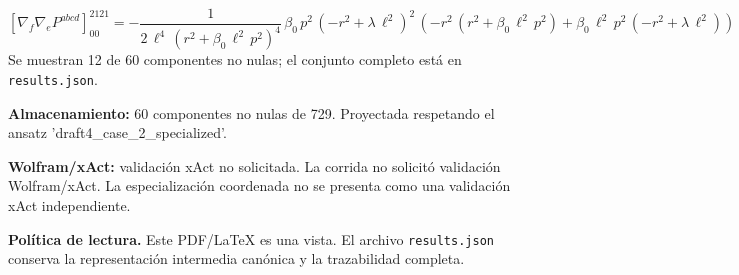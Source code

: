 \documentclass[11pt]{article}
\begin{document}
\begin{dmath*}[breakdepth={5}]
\left[\nabla_f\nabla_e P^{abcd}\right]_{00}^{2121} = -\frac{1}{2\,{\ell}^{4}\,{\left({r}^{2} + \beta_{0}\,{\ell}^{2}\,{p}^{2}\right)}^{4}}\,\beta_{0}\,{p}^{2}\,{\left(-{r}^{2} + \lambda\,{\ell}^{2}\right)}^{2}\,\left(-{r}^{2}\,\left({r}^{2} + \beta_{0}\,{\ell}^{2}\,{p}^{2}\right) + \beta_{0}\,{\ell}^{2}\,{p}^{2}\,\left(-{r}^{2} + \lambda\,{\ell}^{2}\right)\right)
\end{dmath*}
Se muestran 12 de 60 componentes no nulas; el conjunto completo está en \texttt{results.json}.\par
\textbf{Almacenamiento:} 60 componentes no nulas de 729. Proyectada respetando el ansatz 'draft4\_case\_2\_specialized'.\par
\textbf{Wolfram/xAct:} validación xAct no solicitada. La corrida no solicitó validación Wolfram/xAct. La especialización coordenada no se presenta como una validación xAct independiente.\par\medskip
\bigskip\noindent\textbf{Política de lectura.} Este PDF/LaTeX es una vista. El archivo \texttt{results.json} conserva la representación intermedia canónica y la trazabilidad completa.
\end{document}
